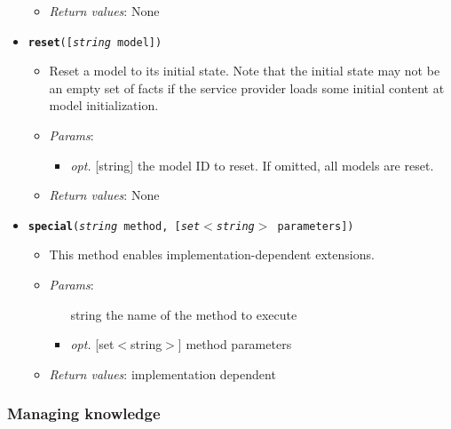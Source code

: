 \begin{itemize}
\begin{itemize}
\item  \emph{Return values}: None
\end{itemize}

\item  \texttt{\textbf{reset}([\emph{string} model])}
\begin{itemize}
\item  Reset a model to its initial state. Note that the initial state may not be an empty set of facts if the service provider loads some initial content at model initialization.
\item  \emph{Params}:
\begin{itemize}
\item  \emph{opt.} [string] the model ID to reset. If omitted, all models are reset. 
\end{itemize}

\item  \emph{Return values}: None
\end{itemize}

\item  \texttt{\textbf{special}(\emph{string} method, [\emph{set$<$string$>$} parameters])}
\begin{itemize}
\item  This method enables implementation-dependent extensions.
\item  \emph{Params}:
\begin{itemize}
\item  [string] the name of the method to execute
\item  \emph{opt.} [set$<$string$>$] method parameters
\end{itemize}

\item  \emph{Return values}: implementation dependent
\end{itemize}

\end{itemize}

\subsubsection{Managing knowledge}


